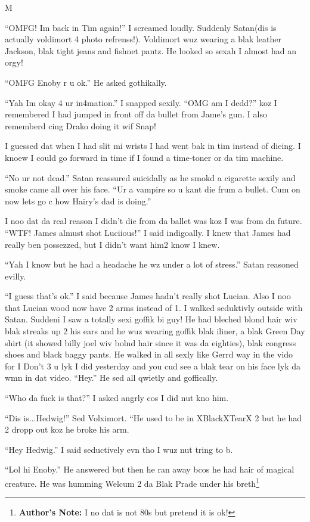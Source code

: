 M\documentclass{article}
\begin{document}
“OMFG! Im back in Tim again!” I screamed loudly. Suddenly Satan(dis is actually voldimort 4 photo refrenss!). Voldimort wuz wearing a blak leather Jackson, blak tight jeans and fishnet pantz. He looked so sexah I almost had an orgy!

“OMFG Enoby r u ok.” He asked gothikally.

“Yah Im okay 4 ur in4mation.” I snapped sexily. “OMG am I dedd?” koz I remembered I had jumped in front off da bullet from Jame’s gun. I also rememberd cing Drako doing it wif Snap!

I guessed dat when I had slit mi wrists I had went bak in tim instead of dieing. I knoew I could go forward in time if I found a time-toner or da tim machine.

“No ur not dead.” Satan reassured suicidally as he smokd a cigarette sexily and smoke came all over his face. “Ur a vampire so u kant die frum a bullet. Cum on now lets go c how Hairy’s dad is doing.”

I noo dat da real reason I didn’t die from da ballet was koz I was from da future. “WTF! James almust shot Luciious!” I said indigoally. I knew that James had really ben possezzed, but I didn’t want him2 know I knew.

“Yah I know but he had a headache he wz under a lot of stress.” Satan reasoned evilly.

“I guess that’s ok.” I said because James hadn’t really shot Lucian. Also I noo that Lucian wood now have 2 arms instead of 1. I walked seduktivly outside with Satan. Suddeni I saw a totally sexi goffik bi guy! He had bleched blond hair wiv blak streaks up 2 his ears and he wuz wearing goffik blak iliner, a blak Green Day shirt (it showed billy joel wiv bolnd hair since it was da eighties), blak congress shoes and black baggy pants. He walked in all sexly like Gerrd way in the vido for I Don’t 3 u lyk I did yesterday and you cud see a blak tear on his face lyk da wmn in dat video. “Hey.” He sed all qwietly and goffically.

“Who da fuck is that?” I asked angrly cos I did nut kno him.

“Dis is...Hedwig!” Sed Volximort. “He used to be in XBlackXTearX 2 but he had 2 dropp out koz he broke his arm.

“Hey Hedwig.” I said seductively evn tho I wuz nut tring to b.

“Lol hi Enoby.” He answered but then he ran away bcos he had hair of magical creature. He was humming Welcum 2 da Blak Prade under his breth\footnote{\textbf{Author's Note: }I no dat is not 80s but pretend it is ok!}
\end{document}
